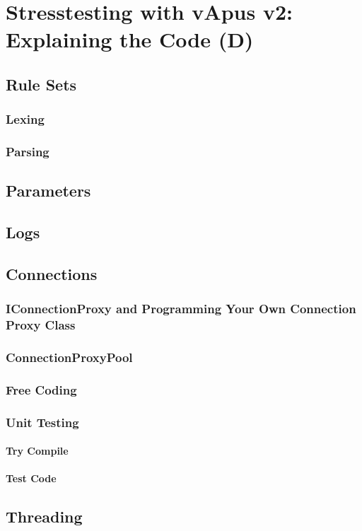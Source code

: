 \section{Stresstesting with vApus v2: Explaining the Code (D)}
\subsection{Rule Sets}
\subsubsection{Lexing}
\subsubsection{Parsing}
\subsection{Parameters}
\subsection{Logs}
\subsection{Connections}
\subsubsection{IConnectionProxy and Programming Your Own Connection Proxy Class}
\subsubsection{ConnectionProxyPool}
\subsubsection{Free Coding}
\subsubsection{Unit Testing}
\paragraph{Try Compile}
\paragraph{Test Code}
\subsection{Threading}
